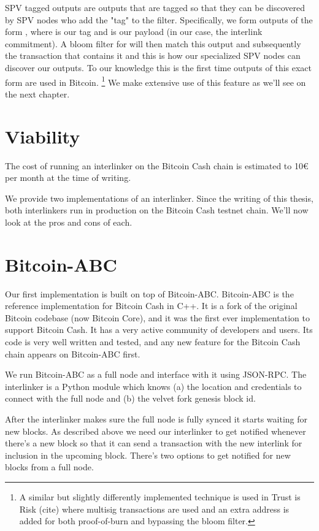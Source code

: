 SPV tagged outputs are outputs that are tagged so that they can be discovered by SPV nodes who add the "tag" to the filter. Specifically, we form outputs of the form , where  is our tag and  is our payload (in our case, the interlink commitment). A bloom filter for  will then match this output and subsequently the transaction that contains it and this is how our specialized SPV nodes can discover our outputs. To our knowledge this is the first time outputs of this exact form are used in Bitcoin.
\footnote{A similar but slightly differently implemented technique is used in Trust is Risk (cite) where multisig transactions are used and an extra address is added for both proof-of-burn and bypassing the bloom filter.}
We make extensive use of this feature as we'll see on the next chapter.

\section{Viability}
The cost of running an interlinker on the Bitcoin Cash chain is estimated to 10€ per month at the time of writing.

We provide two implementations of an interlinker. Since the writing of this thesis, both interlinkers run in production on the Bitcoin Cash testnet chain. We'll now look at the pros and cons of each.

\section{Bitcoin-ABC}
Our first implementation is built on top of Bitcoin-ABC. Bitcoin-ABC is the reference implementation for Bitcoin Cash in C++. It is a fork of the original Bitcoin codebase (now Bitcoin Core), and it was the first ever implementation to support Bitcoin Cash. It has a very active community of developers and users. Its code is very well written and tested, and any new feature for the Bitcoin Cash chain appears on Bitcoin-ABC first.

We run Bitcoin-ABC as a full node and interface with it using JSON-RPC. The interlinker is a Python module which knows (a) the location and credentials to connect with the full node and (b) the velvet fork genesis block id.

After the interlinker makes sure the full node is fully synced it starts waiting for new blocks. As described above we need our interlinker to get notified whenever there's a new block so that it can send a transaction with the new interlink for inclusion in the upcoming block. There's two options to get notified for new blocks from a full node.

